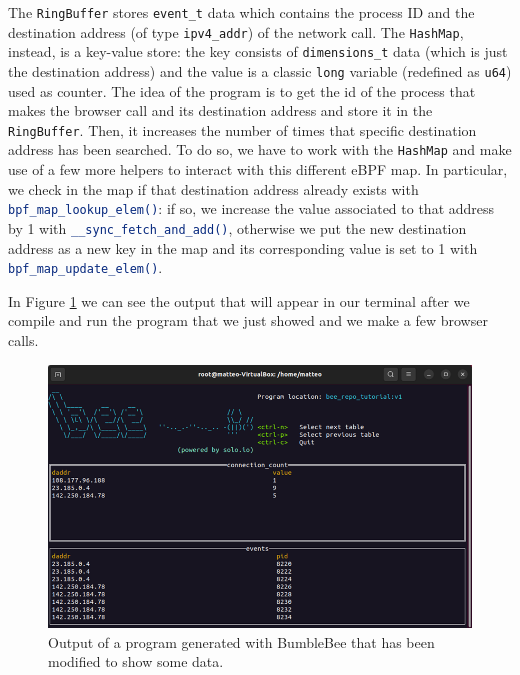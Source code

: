 The \colorbox{backcolour}{\lstinline[style=commandline, language=bash, breaklines=true]|RingBuffer|} stores \colorbox{backcolour}{\lstinline[style=commandline, language=bash, breaklines=true]|event_t|} data which contains the process ID and the destination address (of type \colorbox{backcolour}{\lstinline[style=commandline, language=bash, breaklines=true]|ipv4_addr|}) of the network call.
The \colorbox{backcolour}{\lstinline[style=commandline, language=bash, breaklines=true]|HashMap|}, instead, is a key-value store: the key consists of \colorbox{backcolour}{\lstinline[style=commandline, language=bash, breaklines=true]|dimensions_t|} data (which is just the destination address) and the value is a classic \colorbox{backcolour}{\lstinline[style=commandline, language=bash, breaklines=true]|long|} variable (redefined as \colorbox{backcolour}{\lstinline[style=commandline, language=bash, breaklines=true]|u64|}) used as counter.
The idea of the program is to get the id of the process that makes the browser call and its destination address and store it in the \colorbox{backcolour}{\lstinline[style=commandline, language=bash, breaklines=true]|RingBuffer|}.
Then, it increases the number of times that specific destination address has been searched.
To do so, we have to work with the \colorbox{backcolour}{\lstinline[style=commandline, language=bash, breaklines=true]|HashMap|} and make use of a few more helpers to interact with this different eBPF map. 
In particular, we check in the map if that destination address already exists with \colorbox{backcolour}{\lstinline[style=commandline, language=bash, breaklines=true]|bpf_map_lookup_elem()|}: if so, we increase the value associated to that address by 1 with \colorbox{backcolour}{\lstinline[style=commandline, language=bash, breaklines=true]|__sync_fetch_and_add()|}, otherwise we put the new destination address as a new key in the map and its corresponding value is set to 1 with \colorbox{backcolour}{\lstinline[style=commandline, language=bash, breaklines=true]|bpf_map_update_elem()|}.

In Figure \ref{fig:bee_complete_program_output} we can see the output that will appear in our terminal after we compile and run the program that we just showed and we make a few browser calls.

\begin{figure}[h]
	\centering
	\includegraphics[width=0.7\linewidth]{images/LinuxDevelopment/bee_repo_tut_display.png}
	\caption{Output of a program generated with BumbleBee that has been modified to show some data.}
	\label{fig:bee_complete_program_output}
\end{figure}

